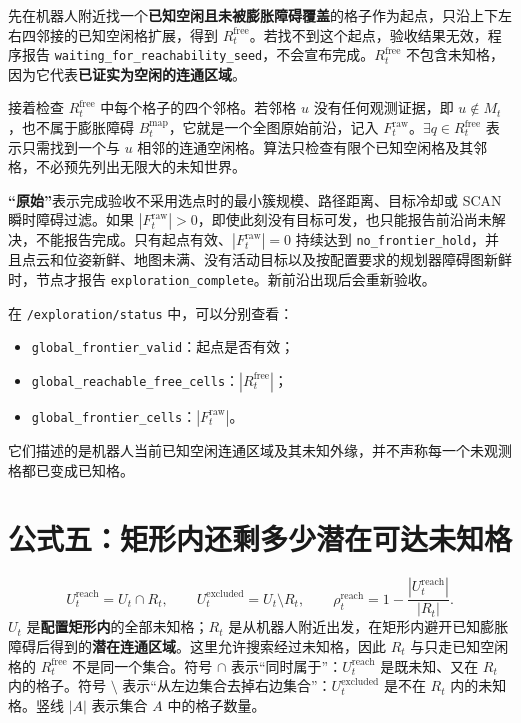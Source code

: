 \documentclass[UTF8,12pt,a4paper]{ctexart}
\begin{document}
先在机器人附近找一个\textbf{已知空闲且未被膨胀障碍覆盖}的格子作为起点，只沿上下左右四邻接的已知空闲格扩展，得到 $R_t^{\mathrm{free}}$。若找不到这个起点，验收结果无效，程序报告 \texttt{waiting\_for\_reachability\_seed}，不会宣布完成。$R_t^{\mathrm{free}}$ 不包含未知格，因为它代表\textbf{已证实为空闲的连通区域}。

接着检查 $R_t^{\mathrm{free}}$ 中每个格子的四个邻格。若邻格 $u$ 没有任何观测证据，即 $u\notin M_t$，也不属于膨胀障碍 $B_t^{\mathrm{map}}$，它就是一个全图原始前沿，记入 $F_t^{\mathrm{raw}}$。$\exists q\in R_t^{\mathrm{free}}$ 表示只需找到一个与 $u$ 相邻的连通空闲格。算法只检查有限个已知空闲格及其邻格，不必预先列出无限大的未知世界。

\textbf{“原始”}表示完成验收不采用选点时的最小簇规模、路径距离、目标冷却或 SCAN 瞬时障碍过滤。如果 $|F_t^{\mathrm{raw}}|>0$，即使此刻没有目标可发，也只能报告前沿尚未解决，不能报告完成。只有起点有效、$|F_t^{\mathrm{raw}}|=0$ 持续达到 \texttt{no\_frontier\_hold}，并且点云和位姿新鲜、地图未满、没有活动目标以及按配置要求的规划器障碍图新鲜时，节点才报告 \texttt{exploration\_complete}。新前沿出现后会重新验收。

在 \texttt{/exploration/status} 中，可以分别查看：
\begin{itemize}
\item \texttt{global\_frontier\_valid}：起点是否有效；
\item \texttt{global\_reachable\_free\_cells}：$|R_t^{\mathrm{free}}|$；
\item \texttt{global\_frontier\_cells}：$|F_t^{\mathrm{raw}}|$。
\end{itemize}
它们描述的是机器人当前已知空闲连通区域及其未知外缘，并不声称每一个未观测格都已变成已知格。

\section{公式五：矩形内还剩多少潜在可达未知格}
\begin{equation}\label{eq:coverage}
U_t^{\mathrm{reach}}=U_t\cap R_t,\qquad
U_t^{\mathrm{excluded}}=U_t\setminus R_t,\qquad
\rho_t^{\mathrm{reach}}
=1-\frac{|U_t^{\mathrm{reach}}|}{|R_t|}.
\end{equation}
$U_t$ 是\textbf{配置矩形内}的全部未知格；$R_t$ 是从机器人附近出发，在矩形内避开已知膨胀障碍后得到的\textbf{潜在连通区域}。这里允许搜索经过未知格，因此 $R_t$ 与只走已知空闲格的 $R_t^{\mathrm{free}}$ 不是同一个集合。符号 $\cap$ 表示“同时属于”：$U_t^{\mathrm{reach}}$ 是既未知、又在 $R_t$ 内的格子。符号 $\setminus$ 表示“从左边集合去掉右边集合”：$U_t^{\mathrm{excluded}}$ 是不在 $R_t$ 内的未知格。竖线 $|A|$ 表示集合 $A$ 中的格子数量。
\end{document}
